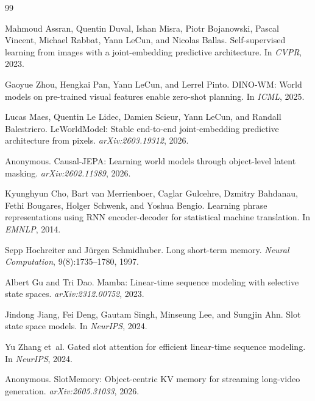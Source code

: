 
\begin{thebibliography}{99}
\setlength{\itemsep}{-0.5pt}

Mahmoud Assran, Quentin Duval, Ishan Misra, Piotr Bojanowski, Pascal Vincent,
Michael Rabbat, Yann LeCun, and Nicolas Ballas.
\newblock Self-supervised learning from images with a joint-embedding predictive architecture.
\newblock In \emph{CVPR}, 2023.

Gaoyue Zhou, Hengkai Pan, Yann LeCun, and Lerrel Pinto.
\newblock DINO-WM: World models on pre-trained visual features enable zero-shot planning.
\newblock In \emph{ICML}, 2025.

Lucas Maes, Quentin Le Lidec, Damien Scieur, Yann LeCun, and Randall Balestriero.
\newblock LeWorldModel: Stable end-to-end joint-embedding predictive architecture from pixels.
\newblock \emph{arXiv:2603.19312}, 2026.

Anonymous.
\newblock Causal-JEPA: Learning world models through object-level latent masking.
\newblock \emph{arXiv:2602.11389}, 2026.

Kyunghyun Cho, Bart van Merrienboer, Caglar Gulcehre, Dzmitry Bahdanau,
Fethi Bougares, Holger Schwenk, and Yoshua Bengio.
\newblock Learning phrase representations using RNN encoder-decoder for statistical machine translation.
\newblock In \emph{EMNLP}, 2014.

Sepp Hochreiter and J{\"u}rgen Schmidhuber.
\newblock Long short-term memory.
\newblock \emph{Neural Computation}, 9(8):1735--1780, 1997.

Albert Gu and Tri Dao.
\newblock Mamba: Linear-time sequence modeling with selective state spaces.
\newblock \emph{arXiv:2312.00752}, 2023.

Jindong Jiang, Fei Deng, Gautam Singh, Minseung Lee, and Sungjin Ahn.
\newblock Slot state space models.
\newblock In \emph{NeurIPS}, 2024.

Yu Zhang et~al.
\newblock Gated slot attention for efficient linear-time sequence modeling.
\newblock In \emph{NeurIPS}, 2024.

Anonymous.
\newblock SlotMemory: Object-centric KV memory for streaming long-video generation.
\newblock \emph{arXiv:2605.31033}, 2026.


\end{thebibliography}
